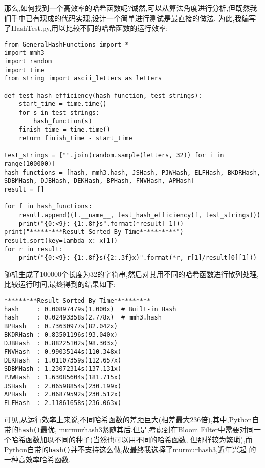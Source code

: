 \documentclass[a4paper]{article}
\begin{document}
那么,如何找到一个高效率的哈希函数呢?诚然,可以从算法角度进行分析,但既然我们手中已有现成的代码实现,设计一个简单进行测试是最直接的做法.
为此,我编写了HashTest.py,用以比较不同的哈希函数的运行效率:
\begin{verbatim}
from GeneralHashFunctions import *
import mmh3
import random
import time
from string import ascii_letters as letters

def test_hash_efficiency(hash_function, test_strings):
    start_time = time.time()
    for s in test_strings:
        hash_function(s)
    finish_time = time.time()
    return finish_time - start_time

test_strings = ["".join(random.sample(letters, 32)) for i in range(100000)]
hash_functions = [hash, mmh3.hash, JSHash, PJWHash, ELFHash, BKDRHash, SDBMHash, DJBHash, DEKHash, BPHash, FNVHash, APHash]
result = []

for f in hash_functions:
    result.append((f.__name__, test_hash_efficiency(f, test_strings)))
    print("{0:<9}: {1:.8f}s".format(*result[-1]))
print("*********Result Sorted By Time**********")
result.sort(key=lambda x: x[1])
for r in result:
    print("{0:<9}: {1:.8f}s({2:.3f}x)".format(*r, r[1]/result[0][1]))
\end{verbatim}

随机生成了100000个长度为32的字符串,然后对其用不同的哈希函数进行散列处理,比较运行时间,最终得到的结果如下:
\begin{verbatim}
*********Result Sorted By Time**********
hash     : 0.00897479s(1.000x)  # Built-in Hash
hash     : 0.02493358s(2.778x)  # mmh3.hash
BPHash   : 0.73630977s(82.042x)
BKDRHash : 0.83501196s(93.040x)
DJBHash  : 0.88225102s(98.303x)
FNVHash  : 0.99035144s(110.348x)
DEKHash  : 1.01107359s(112.657x)
SDBMHash : 1.23072314s(137.131x)
PJWHash  : 1.63085604s(181.715x)
JSHash   : 2.06598854s(230.199x)
APHash   : 2.06879592s(230.512x)
ELFHash  : 2.11861658s(236.063x)
\end{verbatim}

可见,从运行效率上来说,不同哈希函数的差距巨大(相差最大236倍),其中,Python自带的\texttt{hash()}最优,
murmurhash3紧随其后.但是,考虑到在Bloom Filter中需要对同一个哈希函数加以不同的种子(当然也可以用不同的哈希函数,
但那样较为繁琐),而Python自带的\texttt{hash()}并不支持这么做,故最终我选择了murmurhash3,近年兴起
的一种高效率哈希函数.
\end{document}
